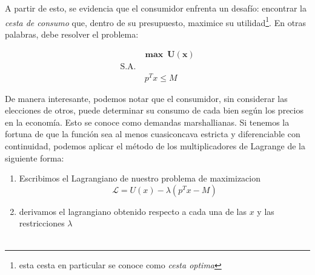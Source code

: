 \documentclass[11pt]{article}
\begin{document}
\begin{flushleft}
    A partir de esto, se evidencia que el consumidor enfrenta un desafío: encontrar la \textit{cesta de consumo} que, dentro de su presupuesto, maximice su utilidad\footnote{esta cesta en particular se conoce como \textit{cesta optima}}. En otras palabras, debe resolver el problema:
    \begin{center}
        \begin{align*}
            & \boldsymbol{\max ~ U \left(x\right)}\\
            \text{S.A.} \\ &~ p^Tx\leq M
        \end{align*}
    \end{center}

    De manera interesante, podemos notar que el consumidor, sin considerar las elecciones de otros, puede determinar su consumo de cada bien según los precios en la economía. Esto se conoce como demandas marshallianas. Si tenemos la fortuna de que la función sea al menos cuasiconcava estricta y diferenciable con continuidad, podemos aplicar el método de los multiplicadores de Lagrange de la siguiente forma:\\

    \begin{enumerate}
        \item Escribimos el Lagrangiano de nuestro problema de maximizacion \vspace{-0.4cm}
        $$\mathcal{L}=U(x)-\lambda(p^Tx-M)$$\vspace{-1.2cm}
        \item derivamos el lagrangiano obtenido respecto a cada una de las $x$ y las restricciones $\lambda$\\~\\


\end{enumerate}
\end{flushleft}
\end{document}
